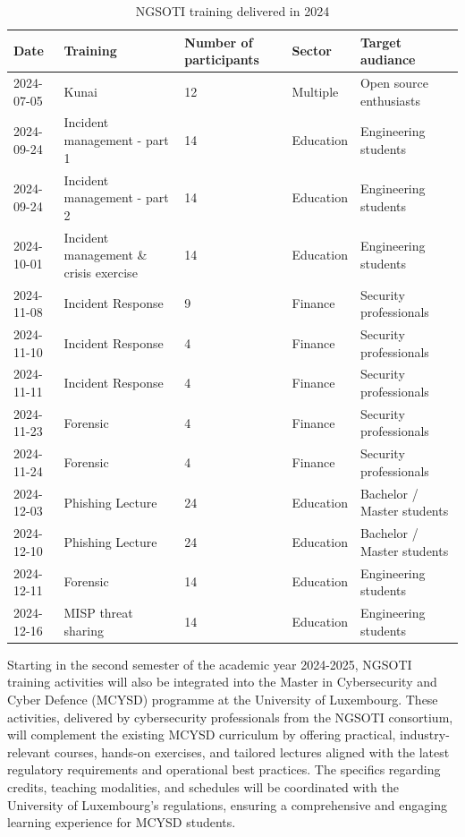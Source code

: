 \begin{table}[H]
	\begin{tabular}{llp{2cm}ll}
		\hline
		Date       & Training            & Number of participants & Sector    & Target audiance         \\
		\hline
		2024-07-05 & Kunai               & 12                     & Multiple  & Open source enthusiasts \\
        2024-09-24 & Incident management - part 1  &14            & Education & Engineering students\\
        2024-09-24 & Incident management  - part 2 & 14           & Education & Engineering students \\
        2024-10-01 & Incident management \& crisis  exercise & 14 & Education & Engineering students\\
		2024-11-08 & Incident Response   & 9                      & Finance   & Security professionals  \\
		2024-11-10 & Incident Response   & 4                      & Finance   & Security professionals  \\
		2024-11-11 & Incident Response   & 4                      & Finance   & Security professionals  \\
		2024-11-23 & Forensic            & 4                      & Finance   & Security professionals  \\
		2024-11-24 & Forensic            & 4                      & Finance   & Security professionals  \\
        	2024-12-03 & Phishing Lecture    & 24 			  & Education & Bachelor / Master students  \\
        	2024-12-10 & Phishing Lecture    & 24 			  & Education & Bachelor / Master students  \\
		2024-12-11 & Forensic            & 14                     & Education & Engineering students    \\
		2024-12-16 & MISP threat sharing & 14                     & Education & Engineering students    \\
		\hline
	\end{tabular}
    \caption{NGSOTI training delivered in 2024}
    \label{deltrain}
\end{table}

Starting in the second semester of the academic year 2024-2025, NGSOTI
training activities will also be integrated into the Master in
Cybersecurity and Cyber Defence (MCYSD) programme at the University of
Luxembourg. These activities, delivered by cybersecurity professionals
from the NGSOTI consortium, will complement the existing MCYSD
curriculum by offering practical, industry-relevant courses, hands-on
exercises, and tailored lectures aligned with the latest regulatory
requirements and operational best practices. The specifics regarding
credits, teaching modalities, and schedules will be coordinated with the
University of Luxembourg's regulations, ensuring a comprehensive and
engaging learning experience for MCYSD students.

